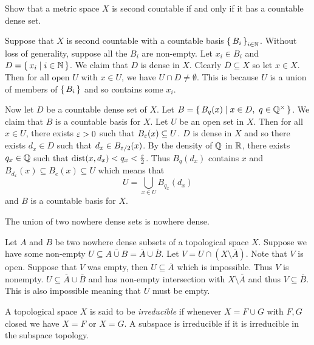 \documentclass[letterpaper, 11pt]{article}
\begin{document}
\begin{exercise}\label{exercise: countable_iff_countable_dense}
  Show that a metric space $X$ is second countable if and only if it has a countable dense set.
\end{exercise}
\begin{pf}
  Suppose that $X$ is second countable with a countable basis $\set{B_{i}}_{i \in \mathbb{N}}$.
  Without loss of generality, suppose all the $B_{i}$ are non-empty.
  Let $x_{i} \in B_{i}$ and $D = \set{x_{i} \mid i \in \mathbb{N}}$.
  We claim that $D$ is dense in $X$.
  Clearly $\overline{D} \subseteq X$ so let $x \in X$.
  Then for all open $U$ with $x \in U$, we have $U \cap D \neq \emptyset$.
  This is because $U$ is a union of members of $\set{B_{i}}$ and so contains some $x_{i}$.

  Now let $D$ be a countable dense set of $X$.
  Let $B = \set{B_{q}(x) | x \in D,~ q \in \mathbb{Q}^{\times}}$.
  We claim that $B$ is a countable basis for $X$.
  Let $U$ be an open set in $X$.
  Then for all $x \in U$, there exists $\varepsilon > 0$ such that $B_{\varepsilon}(x) \subseteq U$.
  $D$ is dense in $X$ and so there exists $d_{x} \in D$ such that $d_{x} \in B_{\varepsilon /2}(x)$.
  By the density of $\mathbb{Q}$ in $\mathbb{R}$, there exists $q_{x} \in \mathbb{Q}$ such that $\operatorname{dist}(x, d_{x}) < q_{x} < \frac{\varepsilon}{2}$.
  Thus $B_{q}(d_{x})$ contains $x$ and $B_{d_{x}}(x) \subseteq B_{e}(x) \subseteq U$ which means that
  \[
    U = \bigcup_{x \in U} B_{q_{x}}(d_{x})
  \]
  and $B$ is a countable basis for $X$.
\end{pf}



\begin{exercise}
  The union of two nowhere dense sets is nowhere dense.
\end{exercise}
\begin{pf}
  Let $A$ and $B$ be two nowhere dense subsets of a topological space $X$.
  Suppose we have some non-empty $U \subseteq \overline{A \cup B} = \overline{A} \cup \overline{B}$.
  Let $V = U \cap (X \setminus \overline{A})$.
  Note that $V$ is open.
  Suppose that $V$ was empty, then $U \subseteq \overline{A}$ which is impossible.
  Thus $V$ is nonempty.
  $U \subseteq \overline{A} \cup \overline{B}$ and has non-empty intersection with $X \setminus \overline{A}$ and thus $V \subseteq \overline{B}$.
  This is also impossible meaning that $U$ must be empty.
\end{pf}

\begin{defn}
  A topological space $X$ is said to be \emph{irreducible} if whenever $X = F \cup G$ with $F, G$ closed we have $X = F$ or $X = G$.
  A subspace is irreducible if it is irreducible in the subspace topology.
\end{defn}
\end{document}
